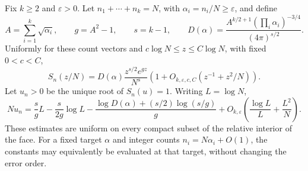 \begin{theorem}\label{thm:simplex-interior}
Fix $k\ge2$ and $\varepsilon>0$. Let $n_1+\cdots+n_k=N$, with
$\alpha_i=n_i/N\ge\varepsilon$, and define
\[
A=\sum_{i=1}^k\sqrt{\alpha_i},\qquad g=A^2-1,\qquad s=k-1,
\qquad
D(\alpha)=\frac{A^{k/2+1}(\prod_i\alpha_i)^{-3/4}}{(4\pi)^{s/2}}.
\]
Uniformly for these count vectors and $c\log N\le z\le C\log N$, with
fixed $0<c<C$,
\begin{equation}\label{eq:simplex-interior-ratio}
S_n(z/N)=D(\alpha)\frac{z^{s/2}e^{gz}}{N^s}
\left(1+O_{k,\varepsilon,c,C}(z^{-1}+z^2/N)\right).
\end{equation}
Let $u_n>0$ be the unique root of $S_n(u)=1$. Writing $L=\log N$,
\begin{equation}\label{eq:simplex-interior-root}
Nu_n=\frac{s}{g}L-\frac{s}{2g}\log L
-\frac{\log D(\alpha)+(s/2)\log(s/g)}{g}
+O_{k,\varepsilon}\!\left(\frac{\log L}{L}+\frac{L^2}{N}\right).
\end{equation}
These estimates are uniform on every compact subset of the relative
interior of the face. For a fixed target $\alpha$ and integer counts
$n_i=N\alpha_i+O(1)$, the constants may equivalently be evaluated at that
target, without changing the error order.
\end{theorem}

